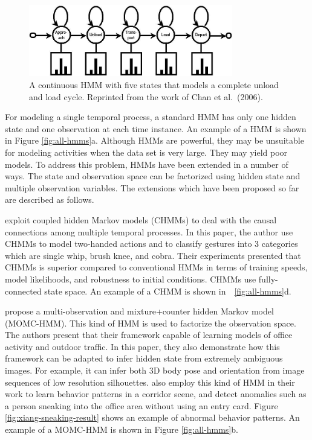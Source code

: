 \begin{figure}[t]
  \begin{center}
    \includegraphics[width=3.5in]{figures/chan-icpr06-hmm.jpg}
    \caption[A continuous HMM with five states that models a complete
    unload and load cycle]{A continuous HMM with five states that
    models a complete unload and load cycle. Reprinted from the work
    of Chan et al.\ (2006).} 
    \label{fig:chan-icpr06-hmm}
  \end{center}
\end{figure}

For modeling a single temporal process, a standard HMM has only one
hidden state and one observation at each time instance. An example of
a HMM is shown in Figure \ref{fig:all-hmms}a. Although HMMs are
powerful, they may be unsuitable for modeling activities when the data
set is very large. They may yield poor models. To address this
problem, HMMs have been extended in a number of ways. The state and
observation space can be factorized using hidden state and multiple
observation variables. The extensions which have been proposed so far
are described as follows.

 exploit coupled hidden Markov models
(CHMMs) to deal with the causal connections among multiple temporal
processes. In this paper, the author use CHMMs to model two-handed
actions and to classify gestures into 3 categories which are single
whip, brush knee, and cobra. Their experiments presented that CHMMs is
superior compared to conventional HMMs in terms of training speeds,
model likelihoods, and robustness to initial conditions. CHMMs use
fully-connected state space. An example of a CHMM is shown
in~\figurename~\ref{fig:all-hmms}d.

 propose a multi-observation and
mixture+counter hidden Markov model (MOMC-HMM). This kind of HMM is
used to factorize the observation space. The authors present that
their framework capable of learning models of office activity and
outdoor traffic. In this paper, they also demonstrate how this
framework can be adapted to infer hidden state from extremely
ambiguous images. For example, it can infer both 3D body pose and
orientation from image sequences of low resolution
silhouettes.  also employ this kind of
HMM in their work to learn behavior patterns in a corridor scene, and
detect anomalies such as a person sneaking into the office area
without using an entry card. Figure \ref{fig:xiang-sneaking-result}
shows an example of abnormal behavior patterns. An example of a
MOMC-HMM is shown in Figure \ref{fig:all-hmms}b.

